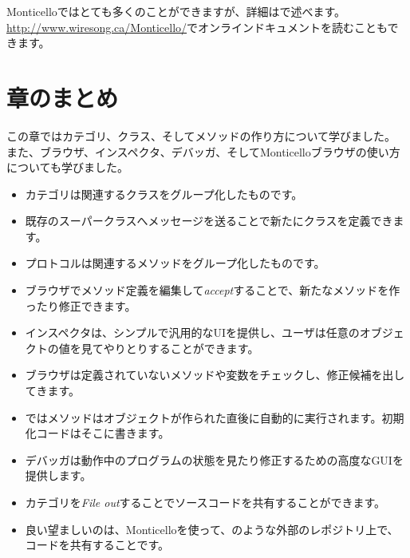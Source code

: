 \documentclass[a4paper,10pt,twoside]{book}
\begin{document}
Monticelloではとても多くのことができますが、詳細はで述べます。
\url{http://www.wiresong.ca/Monticello/}でオンラインドキュメントを読むこともできます。

\section{章のまとめ}
この章ではカテゴリ、クラス、そしてメソッドの作り方について学びました。
また、ブラウザ、インスペクタ、デバッガ、そしてMonticelloブラウザの使い方についても学びました。

\begin{itemize}
  \item カテゴリは関連するクラスをグループ化したものです。
  \item 既存のスーパークラスへメッセージを送ることで新たにクラスを定義できます。
  \item プロトコルは関連するメソッドをグループ化したものです。
  \item ブラウザでメソッド定義を編集して\emph{accept}することで、新たなメソッドを作ったり修正できます。
  \item インスペクタは、シンプルで汎用的なUIを提供し、ユーザは任意のオブジェクトの値を見てやりとりすることができます。
  \item ブラウザは定義されていないメソッドや変数をチェックし、修正候補を出してきます。
  \item \pharo ではメソッドはオブジェクトが作られた直後に自動的に実行されます。初期化コードはそこに書きます。
  \item デバッガは動作中のプログラムの状態を見たり修正するための高度なGUIを提供します。
  \item カテゴリを\emph{File out}することでソースコードを共有することができます。
  \item 良い望ましいのは、Monticelloを使って、\sqsrc のような外部のレポジトリ上で、コードを共有することです。
\end{itemize}

\ifx\wholebook\relax\else
\end{document}
